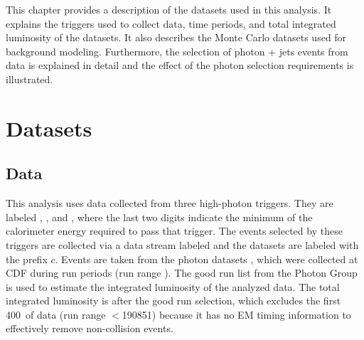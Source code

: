 \vspace{0.015\textheight}
This chapter provides a description of the datasets used in this analysis. It explains the triggers used to collect data, time periods, and total integrated luminosity of the datasets. It also describes the Monte Carlo datasets used for background modeling. Furthermore, the selection of photon + jets events from data is explained in detail and the effect of the photon selection requirements is illustrated.

\section{Datasets}
\vspace{0.03\textheight}
\subsection{Data}
This analysis uses data collected from three high-\pt photon triggers. They are labeled \firstphotrig, \secondphotrig, and \thirdphotrig, where the last two digits indicate the minimum \et of the calorimeter energy required to pass that trigger. The events selected by these triggers are collected via a data stream labeled  and the datasets are labeled with the prefix $c$. Events are taken from the photon datasets \photonDatasets, which were collected at CDF during run periods \runperiods (run range \runrange). The good run list \goodrunfile from the Photon Group is used to estimate the integrated luminosity of the analyzed data. The total integrated luminosity is \datalumAfterGoodRun after the good run selection, which excludes the first 400~\pbi of data (run range $<$190851) because it has no EM timing information to effectively remove non-collision events.

